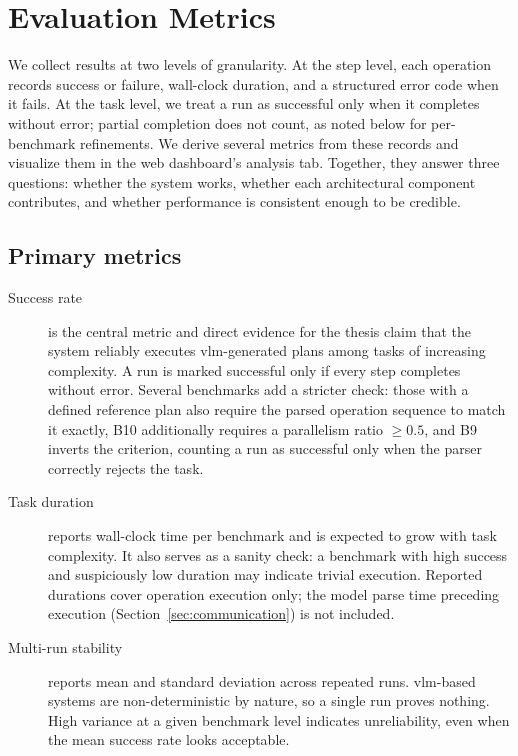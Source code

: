 \documentclass[
     12pt,
     a4paper,
     BCOR=10mm,
     DIV=14,
     listof=totoc,
     bibliography=totoc,
     parskip,
     twoside,
     headsepline
     ]{scrreprt}
\begin{document}
\section{Evaluation Metrics}\label{sec:evaluation-metrics}
We collect results at two levels of granularity. At the step level, each operation records success or failure, wall-clock duration, and a structured error code when it fails. At the task level, we treat a run as successful only when it completes without error; partial completion does not count, as noted below for per-benchmark refinements. We derive several metrics from these records and visualize them in the web dashboard's analysis tab. Together, they answer three questions: whether the system works, whether each architectural component contributes, and whether performance is consistent enough to be credible.

\subsection{Primary metrics}
\begin{description}
	\item[Success rate] is the central metric and direct evidence for the thesis claim that the system reliably executes \gls{vlm}-generated plans among tasks of increasing complexity. A run is marked successful only if every step completes without error. Several benchmarks add a stricter check: those with a defined reference plan also require the parsed operation sequence to match it exactly, B10 additionally requires a parallelism ratio \(\geq 0.5\), and B9 inverts the criterion, counting a run as successful only when the parser correctly rejects the task.
	\item[Task duration] reports wall-clock time per benchmark and is expected to grow with task complexity. It also serves as a sanity check: a benchmark with high success and suspiciously low duration may indicate trivial execution. Reported durations cover operation execution only; the model parse time preceding execution (Section~\ref{sec:communication}) is not included.
	\item[Multi-run stability] reports mean and standard deviation across repeated runs. \gls{vlm}-based systems are non-deterministic by nature, so a single run proves nothing. High variance at a given benchmark level indicates unreliability, even when the mean success rate looks acceptable.
\end{description}
\end{document}
